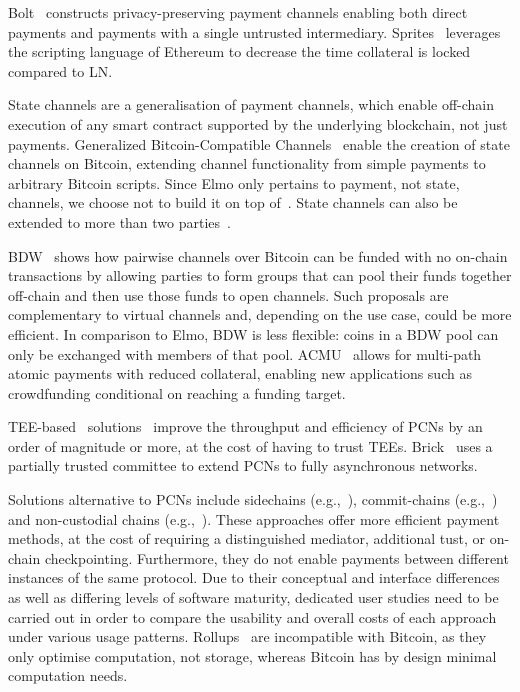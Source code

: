   Bolt~\cite{10.1145/3133956.3134093} constructs privacy-preserving payment
  channels enabling both direct payments and payments with a single untrusted
  intermediary. Sprites~\cite{sprites} leverages the scripting language of
  E\-the\-re\-um to decrease the time collateral is locked compared to LN.

  State channels are a generalisation of payment channels, which enable
  off-chain execution of any smart contract supported by the underlying
  blockchain, not just payments. Generalized Bitcoin-Compatible
  Channels~\cite{DBLP:journals/iacr/AumayrEEFHMMR20} enable the creation of
  state channels on Bitcoin, extending channel functionality from simple
  payments to arbitrary Bitcoin scripts. Since Elmo only pertains to payment,
  not state, channels, we choose not to build it on top
  of~\cite{DBLP:journals/iacr/AumayrEEFHMMR20}. State channels can also be
  extended to more than two
  parties~\cite{DBLP:conf/asiaccs/LiaoZSS22,DBLP:conf/eurocrypt/DziembowskiEFHH19}.

  BDW~\cite{scalable-funding} shows how pairwise channels over Bitcoin can be
  funded with no on-chain transactions by allowing parties to form groups that
  can pool their funds together off-chain and then use those funds to open
  channels. Such proposals are complementary to virtual channels and, depending
  on the use case, could be more efficient. In comparison to Elmo, BDW is less
  flexible: coins in a BDW pool can only be exchanged with members of that
  pool. ACMU~\cite{10.1145/3319535.3345666} allows for multi-path atomic
  payments with reduced collateral, enabling new applications such as
  crowdfunding conditional on reaching a funding target.

  TEE-based~\cite{zhao2019sok}
solutions~\cite{teechan,10.1145/3341301.3359627,DBLP:conf/asiaccs/LiaoZSS22,lee2020routee}
  improve the throughput and efficiency of PCNs by an order of magnitude or
  more, at the cost of having to trust TEEs. Brick~\cite{avarikioti2020brick}
  uses a partially trusted committee to extend PCNs to fully asynchronous
  networks.


  Solutions alternative to PCNs include side\-chains
  (e.g.,~\cite{BCDF+14,sidechains,KiaZin18}), commit-chains
  (e.g.,~\cite{plasma,10.1007/978-3-031-54776-8_2}) and non-cu\-sto\-di\-al chains
  (e.g.,~\cite{plasma,konstantopoulos2019plasma,plasma-lower-bounds}). These
  approaches offer more efficient payment methods, at the cost of
  requiring a distinguished mediator, additional tust, or on-chain
  checkpointing. Furthermore, they do not enable payments between different instances
  of the same protocol.
  Due to their conceptual and interface differences as
  well as differing levels of software maturity, dedicated user studies need to
  be carried out in order to compare the usability and overall costs of each
  approach under various usage patterns. Rollups~\cite{ZKRollup,Optimism} are
  incompatible with Bitcoin, as they only optimise computation, not storage,
  whereas Bitcoin has by design minimal computation needs.

